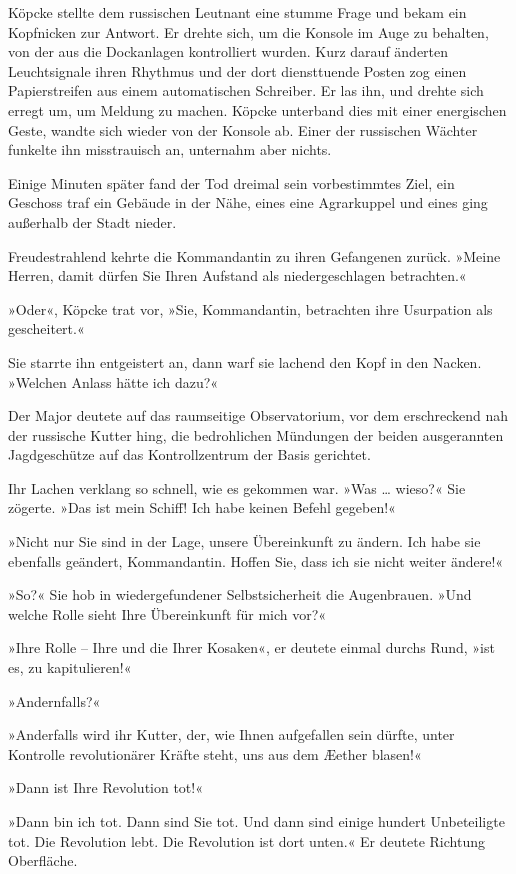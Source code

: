 Köpcke stellte dem russischen Leutnant eine stumme Frage und bekam
ein Kopfnicken zur Antwort. Er drehte sich, um die Konsole im Auge
zu behalten, von der aus die Dockanlagen kontrolliert wurden. Kurz
darauf änderten Leuchtsignale ihren Rhythmus und der dort
diensttuende Posten zog einen Papierstreifen aus einem
automatischen Schreiber. Er las ihn, und drehte sich erregt um, um
Meldung zu machen. Köpcke unterband dies mit einer energischen
Geste, wandte sich wieder von der Konsole ab. Einer der russischen
Wächter funkelte ihn misstrauisch an, unternahm aber nichts.

Einige Minuten später fand der Tod dreimal sein vorbestimmtes Ziel,
ein Geschoss traf ein Gebäude in der Nähe, eines eine Agrarkuppel
und eines ging außerhalb der Stadt nieder.

Freudestrahlend kehrte die Kommandantin zu ihren Gefangenen zurück.
»Meine Herren, damit dürfen Sie Ihren Aufstand als niedergeschlagen
betrachten.«

»Oder«, Köpcke trat vor, »Sie, Kommandantin, betrachten ihre
Usurpation als gescheitert.«

Sie starrte ihn entgeistert an, dann warf sie lachend den Kopf in
den Nacken. »Welchen Anlass hätte ich dazu?«

Der Major deutete auf das raumseitige Observatorium, vor dem
erschreckend nah der russische Kutter hing, die bedrohlichen
Mündungen der beiden ausgerannten Jagdgeschütze auf das
Kontrollzentrum der Basis gerichtet.

Ihr Lachen verklang so schnell, wie es gekommen war. »Was … wieso?«
Sie zögerte. »Das ist mein Schiff! Ich habe keinen Befehl
gegeben!«

»Nicht nur Sie sind in der Lage, unsere Übereinkunft zu ändern. Ich
habe sie ebenfalls geändert, Kommandantin. Hoffen Sie, dass ich sie
nicht weiter ändere!«

»So?« Sie hob in wiedergefundener Selbstsicherheit die Augenbrauen.
»Und welche Rolle sieht Ihre Übereinkunft für mich vor?«

»Ihre Rolle – Ihre und die Ihrer Kosaken«, er deutete einmal durchs
Rund, »ist es, zu kapitulieren!«

»Andernfalls?«

»Anderfalls wird ihr Kutter, der, wie Ihnen aufgefallen sein
dürfte, unter Kontrolle revolutionärer Kräfte steht, uns aus dem
Æether blasen!«

»Dann ist Ihre Revolution tot!«

»Dann bin ich tot. Dann sind Sie tot. Und dann sind einige hundert
Unbeteiligte tot. Die Revolution lebt. Die Revolution ist dort
unten.« Er deutete Richtung Oberfläche.

